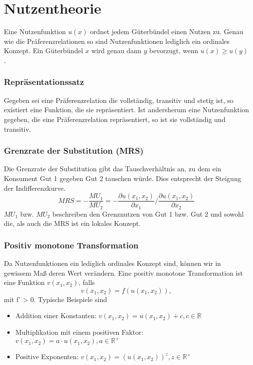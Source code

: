 \section{Nutzentheorie}

Eine Nutzenfunktion $u(x)$ ordnet jedem Güterbündel einen Nutzen zu. Genau wie die Präferenzrelationen so sind Nutzenfunktionen lediglich ein ordinales Konzept. Ein Güterbündel $x$ wird genau dann $y$ bevorzugt, wenn $u(x) \geq u(y)$. %

\subsubsection*{Repräsentationssatz}
Gegeben sei eine Präferenzrelation die vollständig, transitiv und stetig ist, so existiert eine Funktion, die sie repräsentiert. Ist andersherum eine Nutzenfunktion gegeben, die eine Präferenzrelation repräsentiert, so ist sie vollständig und transitiv.

\subsubsection*{Grenzrate der Substitution (MRS)}

Die Grenzrate der Substitution gibt das Tauschverhältnis an, zu dem ein Konsument Gut 1 gegeben Gut 2 tauschen würde. Dies entsprecht der Steigung der Indifferenzkurve.
	$$ MRS = - \frac{MU_1}{MU_2} = - \frac{\partial u(x_1, x_2)}{\partial x_1} \big/ \frac{\partial u(x_1, x_2)}{\partial x_2} $$
$MU_1$ bzw. $MU_2$ beschreiben den Grenznutzen von Gut 1 bzw. Gut 2 und sowohl die, als auch die MRS ist ein lokales Konzept.

\subsubsection*{Positiv monotone Transformation}

Da Nutzenfunktionen ein lediglich ordinales Konzept sind, können wir in gewissem Maß deren Wert verändern. Eine positiv monotone Transformation ist eine Funktion $v(x_1, x_2)$, falls
$$ v(x_1, x_2) = f(u(x_1, x_2)), $$
mit f' > 0. Typische Beispiele sind
\begin{itemize}
	\item Addition einer Konstanten: $v(x_1, x_2) = u(x_1, x_2) + c, c \in \mathbb{R}$
	\item Multiplikation mit einem positiven Faktor: $v(x_1, x_2) = a \cdot u(x_1, x_2), a \in \mathbb{R}^+$
	\item Positive Exponenten: $v(x_1, x_2) = \left(u(x_1, x_2) \right)^{z}, z \in \mathbb{R}^+$
\end{itemize}

